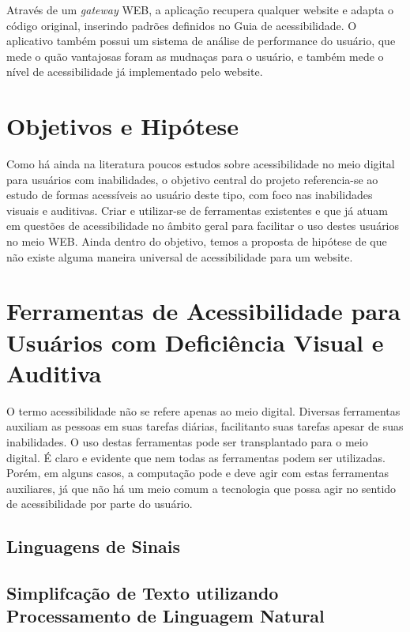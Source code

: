 \documentclass[
	12pt,				%
	oneside,			%
	a4paper,			%
	english,			%
	brazil				%
	]{abntex2ppgsi}
\begin{document}
Através de um \textit{gateway} WEB, a aplicação recupera qualquer website e adapta o código original, inserindo padrões definidos no Guia de acessibilidade. O aplicativo também possui um sistema de análise de performance do usuário, que mede o quão vantajosas foram as mudnaças para o usuário, e também mede o nível de acessibilidade já implementado pelo website.

\chapter{Objetivos e Hipótese}

Como há ainda na literatura poucos estudos sobre acessibilidade no meio digital para usuários com inabilidades, o objetivo central do projeto referencia-se ao estudo de formas acessíveis ao usuário deste tipo, com foco nas inabilidades visuais e auditivas. Criar e utilizar-se de ferramentas existentes e que já atuam em questões de acessibilidade no âmbito geral para facilitar o uso destes usuários no meio WEB. 
Ainda dentro do objetivo, temos a proposta de hipótese de que não existe alguma maneira universal de acessibilidade para um website. 


\chapter{Ferramentas de Acessibilidade para Usuários com Deficiência Visual e Auditiva}

O termo acessibilidade não se refere apenas ao meio digital. Diversas ferramentas auxiliam as pessoas em suas tarefas diárias, facilitanto suas tarefas apesar de suas inabilidades. O uso destas ferramentas pode ser transplantado para o meio digital. É claro e evidente que nem todas as ferramentas podem ser utilizadas. Porém, em alguns casos, a computação pode e deve agir com estas ferramentas auxiliares, já que não há um meio comum a tecnologia que possa agir no sentido de acessibilidade por parte do usuário. 

\section{Linguagens de Sinais}



\section{Simplifcação de Texto utilizando Processamento de Linguagem Natural}
\end{document}
